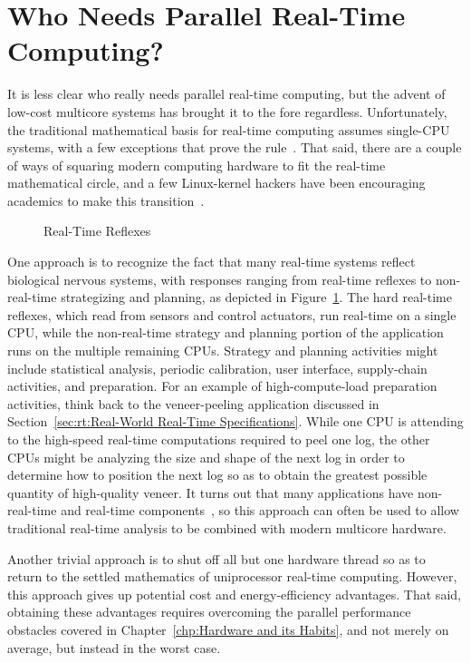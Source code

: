 \section{Who Needs Parallel Real-Time Computing?}
\label{sec:rt:Who Needs Parallel Real-Time Computing?}

It is less clear who really needs parallel real-time computing, but
the advent of low-cost multicore systems has brought it to the fore
regardless.
Unfortunately, the traditional mathematical basis for real-time
computing assumes single-CPU systems, with a few exceptions that
prove the rule~\cite{BjoernBrandenburgPhD}.
That said, there are a couple of ways of squaring modern computing
hardware to fit the real-time mathematical circle, and a few Linux-kernel
hackers have been encouraging academics to make this
transition~\cite{ThomasGleixner2010AcademiaVsReality}.

\begin{figure}[tb]
\centering
{}
\caption{Real-Time Reflexes}
\label{fig:rt:Real-Time Reflexes}
\end{figure}

One approach is to recognize the fact that many real-time systems
reflect biological nervous systems, with responses ranging from
real-time reflexes to non-real-time strategizing and planning,
as depicted in
Figure~\ref{fig:rt:Real-Time Reflexes}.
The hard real-time reflexes, which read from sensors and control
actuators, run real-time on a single CPU, while the non-real-time
strategy and planning portion of the application runs on the multiple
remaining CPUs.
Strategy and planning activities might include statistical analysis,
periodic calibration, user interface, supply-chain activities, and
preparation.
For an example of high-compute-load preparation activities, think back
to the veneer-peeling application discussed in
Section~\ref{sec:rt:Real-World Real-Time Specifications}.
While one CPU is attending to the high-speed real-time computations
required to peel one log, the other CPUs might be analyzing the size
and shape of the next log in order to determine how to position the
next log so as to obtain the greatest possible quantity of high-quality
veneer.
It turns out that many applications have non-real-time and real-time
components~\cite{RobertBerry2008IBMSysJ}, so this approach can
often be used to allow traditional real-time analysis to be combined
with modern multicore hardware.

Another trivial approach is to shut off all but one hardware thread so as
to return to the settled mathematics of uniprocessor real-time
computing.
However, this approach gives up potential cost and energy-efficiency
advantages.
That said, obtaining these advantages requires overcoming the parallel
performance obstacles covered in
Chapter~\ref{chp:Hardware and its Habits},
and not merely on average, but instead in the worst case.

